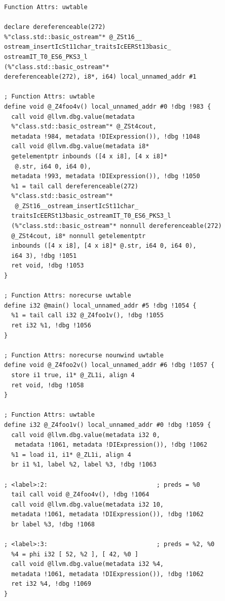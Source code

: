 \documentclass[12pt,oneside]{memoir}
\begin{document}
\begin{lstlisting}[frame=single,caption={Međureprezentacija bez optimizacije celovitog programa }, captionpos=b]
 Function Attrs: uwtable

declare dereferenceable(272) 
%"class.std::basic_ostream"* @_ZSt16__
ostream_insertIcSt11char_traitsIcEERSt13basic_
ostreamIT_T0_ES6_PKS3_l
(%"class.std::basic_ostream"* 
dereferenceable(272), i8*, i64) local_unnamed_addr #1

; Function Attrs: uwtable
define void @_Z4foo4v() local_unnamed_addr #0 !dbg !983 {
  call void @llvm.dbg.value(metadata 
  %"class.std::basic_ostream"* @_ZSt4cout, 
  metadata !984, metadata !DIExpression()), !dbg !1048
  call void @llvm.dbg.value(metadata i8* 
  getelementptr inbounds ([4 x i8], [4 x i8]*
   @.str, i64 0, i64 0), 
  metadata !993, metadata !DIExpression()), !dbg !1050
  %1 = tail call dereferenceable(272) 
  %"class.std::basic_ostream"*
   @_ZSt16__ostream_insertIcSt11char_
  traitsIcEERSt13basic_ostreamIT_T0_ES6_PKS3_l
  (%"class.std::basic_ostream"* nonnull dereferenceable(272) 
  @_ZSt4cout, i8* nonnull getelementptr 
  inbounds ([4 x i8], [4 x i8]* @.str, i64 0, i64 0), 
  i64 3), !dbg !1051
  ret void, !dbg !1053
}

; Function Attrs: norecurse uwtable
define i32 @main() local_unnamed_addr #5 !dbg !1054 {
  %1 = tail call i32 @_Z4foo1v(), !dbg !1055
  ret i32 %1, !dbg !1056
}

; Function Attrs: norecurse nounwind uwtable
define void @_Z4foo2v() local_unnamed_addr #6 !dbg !1057 {
  store i1 true, i1* @_ZL1i, align 4
  ret void, !dbg !1058
}

; Function Attrs: uwtable
define i32 @_Z4foo1v() local_unnamed_addr #0 !dbg !1059 {
  call void @llvm.dbg.value(metadata i32 0,
   metadata !1061, metadata !DIExpression()), !dbg !1062
  %1 = load i1, i1* @_ZL1i, align 4
  br i1 %1, label %2, label %3, !dbg !1063

; <label>:2:                              ; preds = %0
  tail call void @_Z4foo4v(), !dbg !1064
  call void @llvm.dbg.value(metadata i32 10, 
  metadata !1061, metadata !DIExpression()), !dbg !1062
  br label %3, !dbg !1068

; <label>:3:                              ; preds = %2, %0
  %4 = phi i32 [ 52, %2 ], [ 42, %0 ]
  call void @llvm.dbg.value(metadata i32 %4, 
  metadata !1061, metadata !DIExpression()), !dbg !1062
  ret i32 %4, !dbg !1069
}

\end{lstlisting}
\end{document}
